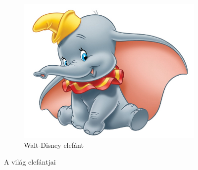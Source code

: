 \documentclass[a4paper]{article}
\begin{document}
\begin{figure}
\begin{subfigure}[t]{0.3\textwidth}
\centering
\includegraphics[width=\textwidth]{dumbo.jpg}
\caption{Walt-Disney elefánt}
\end{subfigure}
\caption{A világ elefántjai}
\end{figure}
\end{document}
